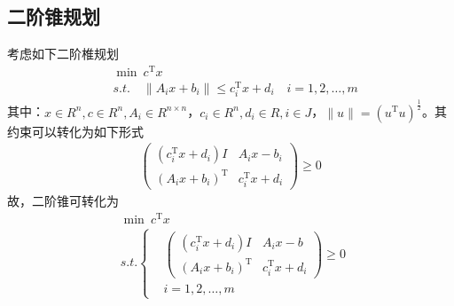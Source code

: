     \subsection{二阶锥规划}
        \par
        考虑如下二阶椎规划
        \begin{align*}
          & \mathop{\min} \  c^\mathrm{T}  x\\
          & s.t.\quad \|A_ix+b_i\|\leqslant c_i^\mathrm{T} x+d_i\quad i=1,2,\ldots ,m
        \end{align*}
        其中：$x\in R^n,c\in R^n,A_i\in R^{n\times n}$，$c_i\in R^n,d_i\in R,i\in J$，$\|u\|=(u^\mathrm{T} u)^{\frac 12 }$。其约束可以转化为如下形式
        \begin{align*}
          \begin{pmatrix} (c_i^\mathrm{T} x+d_i)I & A_ix-b_i\\(A_ix+b_i)^\mathrm{T} & c_i^\mathrm{T} x+d_i\end{pmatrix}\geqslant 0
        \end{align*}
        故，二阶锥可转化为
        \begin{align*}
          & \mathop{\min} \  c^\mathrm{T}  x\\
          & s.t.\left\{
          \begin{aligned}
          &\begin{pmatrix} (c_i^\mathrm{T} x+d_i)I & A_ix-b\\(A_ix+b_i)^\mathrm{T} & c_i^\mathrm{T} x+d_i\end{pmatrix} \geqslant 0\\
          & i=1,2,\ldots ,m
          \end{aligned}
          \right.
        \end{align*}
